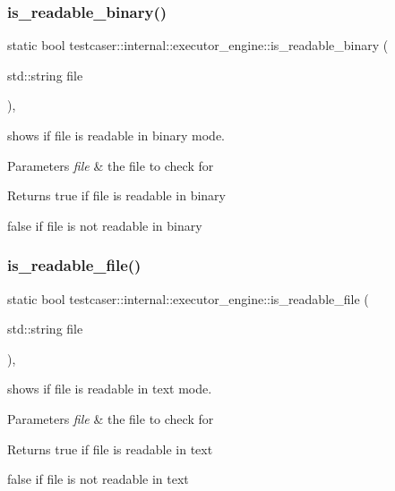 \subsubsection{\texorpdfstring{is\_readable\_binary()}{is\_readable\_binary()}}
{\footnotesize\ttfamily static bool testcaser\+::internal\+::executor\+\_\+engine\+::is\+\_\+readable\+\_\+binary (\begin{DoxyParamCaption}\item[{std\+::string}]{file }\end{DoxyParamCaption})\hspace{0.3cm}{\ttfamily [inline]}, {\ttfamily [static]}}



shows if file is readable in binary mode. 


\begin{DoxyParams}{Parameters}
{\em file} & the file to check for \\
\hline
\end{DoxyParams}
\begin{DoxyReturn}{Returns}
true if file is readable in binary 

false if file is not readable in binary 
\end{DoxyReturn}
\mbox{\label{structtestcaser_1_1internal_1_1executor__engine_a3649324b1da2b5fc41627ca7a73135f4}} 
\subsubsection{\texorpdfstring{is\_readable\_file()}{is\_readable\_file()}}
{\footnotesize\ttfamily static bool testcaser\+::internal\+::executor\+\_\+engine\+::is\+\_\+readable\+\_\+file (\begin{DoxyParamCaption}\item[{std\+::string}]{file }\end{DoxyParamCaption})\hspace{0.3cm}{\ttfamily [inline]}, {\ttfamily [static]}}



shows if file is readable in text mode. 


\begin{DoxyParams}{Parameters}
{\em file} & the file to check for \\
\hline
\end{DoxyParams}
\begin{DoxyReturn}{Returns}
true if file is readable in text 

false if file is not readable in text 
\end{DoxyReturn}
\mbox{\label{structtestcaser_1_1internal_1_1executor__engine_a80ed3584cab00a573de09502df329919}} 
